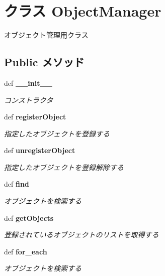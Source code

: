 \section{クラス ObjectManager}
\label{classsource__py_1_1_object_manager_1_1_object_manager}
オブジェクト管理用クラス  


\subsection*{Public メソッド}
\begin{CompactItemize}
\item 
def {\bf \_\-\_\-init\_\-\_\-}
\begin{CompactList}\small\item\em コンストラクタ \item\end{CompactList}\item 
def {\bf registerObject}
\begin{CompactList}\small\item\em 指定したオブジェクトを登録する \item\end{CompactList}\item 
def {\bf unregisterObject}
\begin{CompactList}\small\item\em 指定したオブジェクトを登録解除する \item\end{CompactList}\item 
def {\bf find}
\begin{CompactList}\small\item\em オブジェクトを検索する \item\end{CompactList}\item 
def {\bf getObjects}
\begin{CompactList}\small\item\em 登録されているオブジェクトのリストを取得する \item\end{CompactList}\item 
def {\bf for\_\-each}
\begin{CompactList}\small\item\em オブジェクトを検索する \item\end{CompactList}\end{CompactItemize}
